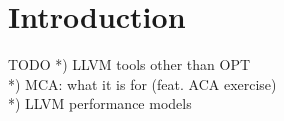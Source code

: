 
\section{Introduction}


\begin{frame}{TODO}
*) LLVM tools other than OPT\\
*) MCA: what it is for (feat. ACA exercise)\\
*) LLVM performance models\\
\end{frame}
